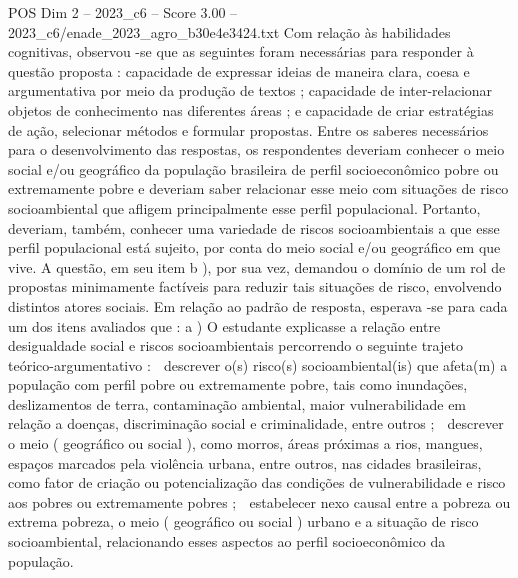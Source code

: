 \begin{textsample}{POS Dim 2 – 2023\_c6 – Score 3.00 – 2023\_c6/enade\_2023\_agro\_b30e4e3424.txt}
Com relação às habilidades cognitivas, observou -se que as seguintes foram necessárias para responder à questão proposta : capacidade de expressar ideias de maneira clara, coesa e argumentativa por meio da produção de textos ; capacidade de inter-relacionar objetos de conhecimento nas diferentes áreas ; e capacidade de criar estratégias de ação, selecionar métodos e formular propostas.
Entre os saberes necessários para o desenvolvimento das respostas, os respondentes deveriam conhecer o meio social e/ou geográfico da população brasileira de perfil socioeconômico pobre ou extremamente pobre e deveriam saber relacionar esse meio com situações de risco socioambiental que afligem principalmente esse perfil populacional.
Portanto, deveriam, também, conhecer uma variedade de riscos socioambientais a que esse perfil populacional está sujeito, por conta do meio social e/ou geográfico em que vive.
A questão, em seu item b ), por sua vez, demandou o domínio de um rol de propostas minimamente factíveis para reduzir tais situações de risco, envolvendo distintos atores sociais.
Em relação ao padrão de resposta, esperava -se para cada um dos itens avaliados que : a ) O estudante explicasse a relação entre desigualdade social e riscos socioambientais percorrendo o seguinte trajeto teórico-argumentativo :  descrever o(s) risco(s) socioambiental(is) que afeta(m) a população com perfil pobre ou extremamente pobre, tais como inundações, deslizamentos de terra, contaminação ambiental, maior vulnerabilidade em relação a doenças, discriminação social e criminalidade, entre outros ;  descrever o meio ( geográfico ou social ), como morros, áreas próximas a rios, mangues, espaços marcados pela violência urbana, entre outros, nas cidades brasileiras, como fator de criação ou potencialização das condições de vulnerabilidade e risco aos pobres ou extremamente pobres ;  estabelecer nexo causal entre a pobreza ou extrema pobreza, o meio ( geográfico ou social ) urbano e a situação de risco socioambiental, relacionando esses aspectos ao perfil socioeconômico da população.

\end{textsample}
